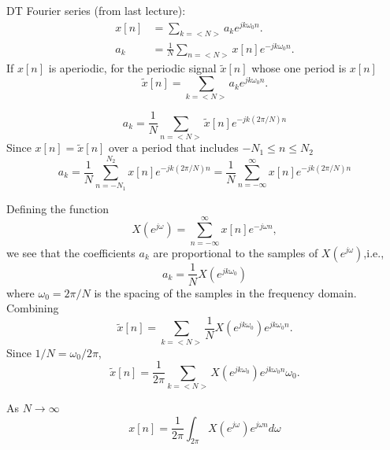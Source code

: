 \begin{frame}
	DT Fourier series (from last lecture):
    \begin{align*}
        x[n] &= \sum_{k=<N>} a_k e^{jk\omega_0 n}.\\
        a_k &= \frac{1}{N}\sum_{n=<N>} x[n]e^{-jk\omega_0 n}.
    \end{align*}
    If $x[n]$ is aperiodic, for the periodic signal $\tilde{x}[n]$ whose one period is $x[n]$
    \begin{equation*}
        \tilde{x}[n] = \sum_{k=<N>}  a_ke^{jk\omega_0 n}.
    \end{equation*}

    \begin{equation*}
        a_k = \frac{1}{N} \sum_{n=<N>}\tilde{x}[n]e^{-jk(2\pi/N) n}
    \end{equation*}
    Since $x[n] = \tilde{x}[n]$ over a period that includes $-N_1\leq n\leq N_2$
    \begin{equation*}
        a_k = \frac{1}{N} \sum_{n=-N_1}^{N_2}{x}[n]e^{-jk(2\pi/N) n} = \frac{1}{N} \sum_{n=-\infty}^{\infty}{x}[n]e^{-jk(2\pi/N) n}
    \end{equation*}
\end{frame}

\begin{frame}
    Defining the function
    \begin{equation*}
        X(e^{j\omega}) = \sum_{n=-\infty}^{\infty}x[n]e^{-j\omega n},
    \end{equation*}
    we see that the coefficients $a_k$ are proportional to the samples of $X(e^{j\omega})$,i.e.,
    \begin{equation*}
        a_k = \frac{1}{N} X(e^{jk\omega_0})
    \end{equation*}
    where $\omega_0 = 2\pi/N$ is the spacing of the samples in the frequency domain. Combining
    \begin{equation*}
        \tilde{x}[n] = \sum_{k=<N>}   \frac{1}{N} X(e^{jk\omega_0}) e^{jk\omega_0 n}.
    \end{equation*}
    Since $1/N = \omega_0/2\pi$,
    \begin{equation*}
        \tilde{x}[n] = \frac{1}{2\pi}\sum_{k=<N>}    X(e^{jk\omega_0}) e^{jk\omega_0 n}\omega_0.
    \end{equation*}

    As $N\longrightarrow \infty$
    \begin{equation*}
      x[n] = \frac{1}{2\pi}\int_{2\pi} X(e^{j\omega}) e^{j\omega n}d\omega
    \end{equation*}
\end{frame}

